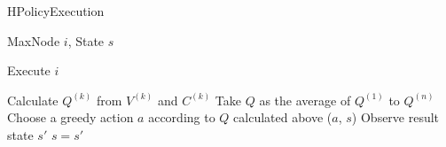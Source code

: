 \documentclass{article}
\begin{document}
\begin{algorithm}[t]
\caption{HPolicyExecution} \label{fig:ExePolicy}
\begin{algorithmic}[1]
\REQUIRE MaxNode $i$, State $s$

\STATE Execute $i$

\ELSE
{}
\STATE Calculate $Q^{(k)}$ from $V^{(k)}$ and $C^{(k)}$
\ENDFOR
\STATE Take $Q$ as the average of $Q^{(1)}$ to $Q^{(n)}$
\STATE Choose a greedy action $a$ according to $Q$ calculated above
($a$, $s$)
\STATE Observe result state $s'$
\STATE $s=s'$
\ENDWHILE
\ENDIF

\end{algorithmic}
\end{algorithm} 
\end{document}
